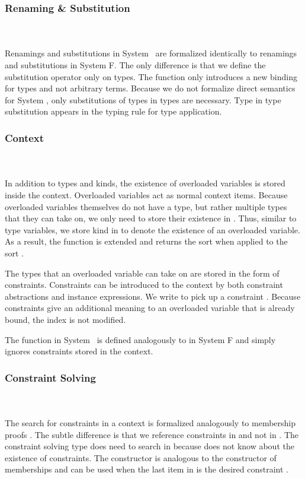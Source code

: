 \subsubsection{Renaming \& Substitution}\hfill\\\\
Renamings and substitutions in System \Fo\ are formalized identically to renamings and substitutions in System F. 
The only difference is that we define the substitution operator only on types. 
\Fosubs
The  function only introduces a new binding for types and not arbitrary terms.
Because we do not formalize direct semantics for System \Fo, only substitutions of types in types are necessary. Type in type substitution appears in the typing rule for type application.

\subsubsection{Context}\hfill\\\\
In addition to types and kinds, the existence of overloaded variables is stored inside the context. Overloaded variables act as normal context items. 
Because overloaded variables themselves do not have a type, but rather multiple types that they can take on, we only need to store their existence in . Thus, similar to type variables, we store kind  in  to denote the existence of an overloaded variable. As a result, the  function is extended and returns the sort  when applied to the sort .

\noindent The types that an overloaded variable can take on are stored in the form of constraints. Constraints can be introduced to the context by both constraint abstractions and instance expressions.
\FoCtx
We write    to pick up a constraint . 
Because constraints give an additional meaning to an overloaded variable that is already bound, the index  is not modified. 

\noindent The  function in System \Fo\ is defined analogously to  in System F and simply ignores constraints stored in the context.

\subsubsection{Constraint Solving}\hfill\\\\
The search for constraints in a context is formalized analogously to membership proofs   . The subtle difference is that we reference constraints in  and not in . The constraint solving type does need to search in  because  does not know about the existence of constraints.
\FoCstrSolve
The  constructor is analogous to the  constructor of memberships and can be used when the last item in  is the desired constraint .

